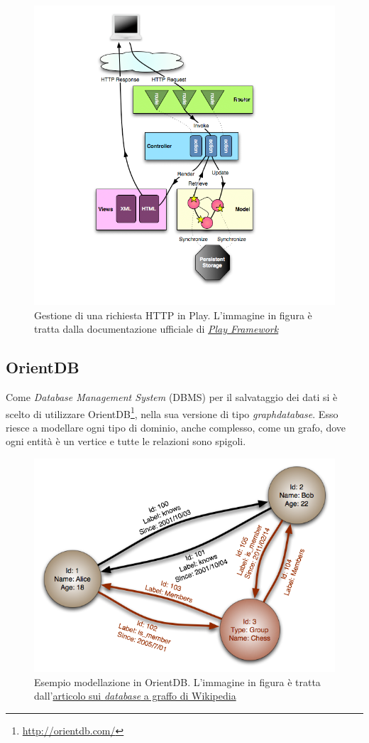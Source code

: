 \begin{figure}[h]
\centering
\includegraphics[width=0.8\linewidth]{immagini/diagrams_path}
\caption[Gestione di una richiesta HTTP in Play]{Gestione di una richiesta HTTP in Play. L'immagine in figura è tratta dalla documentazione ufficiale di \href{https://www.playframework.com/documentation/1.0/main}{\textit{Play Framework}}}
\label{fig:diagrams_path}
\end{figure}

\newpage
\subsection*{OrientDB}
Come \textit{Database Management System} (DBMS) per il salvataggio dei dati si è scelto di utilizzare OrientDB\footnote{\url{http://orientdb.com/}}, nella sua versione di tipo \textit{graphdatabase}. Esso riesce a modellare ogni tipo di dominio, anche complesso, come un grafo, dove ogni entità è un vertice e tutte le relazioni sono spigoli.
\begin{figure}[h]
\centering
\includegraphics[width=0.8\linewidth]{immagini/GraphDatabase_PropertyGraph}
\caption[Esempio modellazione in OrientDB]{Esempio modellazione in OrientDB. L'immagine in figura è tratta dall'\href{https://en.wikipedia.org/wiki/Graph_database}{articolo sui \textit{database} a graffo di Wikipedia}}
\label{fig:GraphDatabase_PropertyGraph}
\end{figure}

